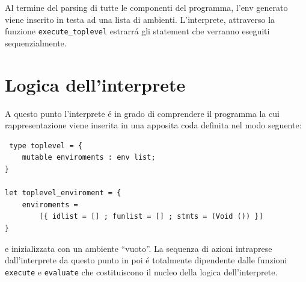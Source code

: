 \documentclass[a4paper,10pt]{article}
\begin{document}
Al termine del parsing di tutte le componenti del programma, l'env generato
viene inserito in testa ad una lista di ambienti. L'interprete, attraverso la
funzione \texttt{execute\_toplevel} estrarr\'a gli statement che verranno
eseguiti sequenzialmente.

\section{Logica dell'interprete}
A questo punto l'interprete \'e in grado di comprendere il programma la cui
rappresentazione viene inserita in una apposita coda definita nel modo seguente:
\begin{verbatim}
 type toplevel = {
    mutable enviroments : env list;
}

let toplevel_enviroment = {
    enviroments =  
        [{ idlist = [] ; funlist = [] ; stmts = (Void ()) }]
}
\end{verbatim}

e inizializzata con un ambiente ``vuoto''. La sequenza di azioni intraprese
dall'interprete da questo punto in poi \'e totalmente dipendente dalle
funzioni \texttt{execute} e \texttt{evaluate} che costituiscono il nucleo della
logica dell'interprete.
\end{document}

